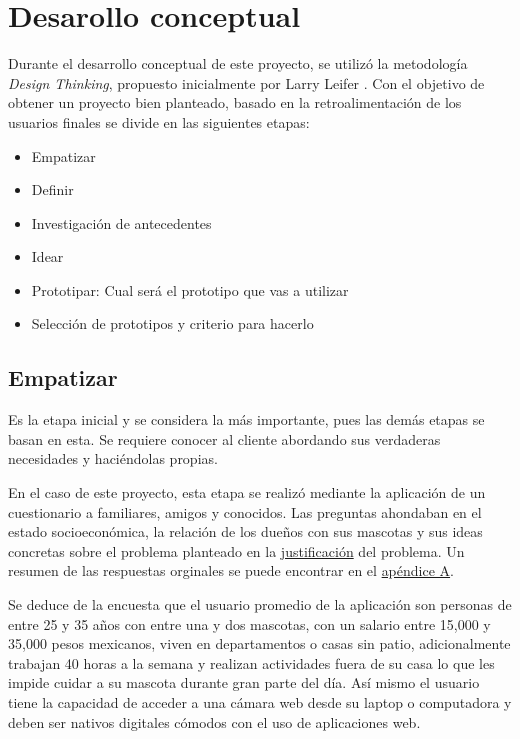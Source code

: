 \section{Desarollo conceptual}
\label{sec:desarrolloconceptual}
Durante el desarrollo conceptual de este proyecto, se utilizó la metodología \textit{Design Thinking}, propuesto inicialmente por Larry Leifer \textcite{plattner2011}. Con el objetivo de obtener un proyecto bien planteado, basado en la retroalimentación de los usuarios finales se divide en las siguientes etapas:


\begin{itemize}
  \item Empatizar
  \item Definir
  \item Investigación de antecedentes
  \item Idear
  \item Prototipar: Cual será el prototipo que vas a utilizar
  \item Selección de prototipos y criterio para hacerlo  
\end{itemize}


\subsection{Empatizar}

Es la etapa inicial y se considera la más importante, pues las demás etapas se basan en esta. Se requiere conocer al cliente abordando sus verdaderas necesidades y haciéndolas propias. 

En el caso de este proyecto, esta etapa se realizó mediante la aplicación de un cuestionario a familiares, amigos y conocidos. Las preguntas ahondaban en el estado socioeconómica, la relación de los dueños con sus mascotas y sus ideas concretas sobre el problema planteado en la \hyperref[sec:justificacion]{justificación} del problema. Un resumen de las respuestas orginales se puede encontrar en el \hyperref[ape:tablaencuesta]{apéndice A}.


Se deduce de la encuesta que el usuario promedio de la aplicación son personas de entre 25 y 35 años con entre una y dos mascotas, con un salario entre 15,000 y 35,000 pesos mexicanos, viven en departamentos o casas sin patio, adicionalmente trabajan 40 horas a la semana y realizan actividades fuera de su casa lo que les impide cuidar a su mascota durante gran parte del día. Así mismo el usuario tiene la capacidad de acceder a una cámara web desde su laptop o computadora y deben ser nativos digitales cómodos con el uso de aplicaciones web.

